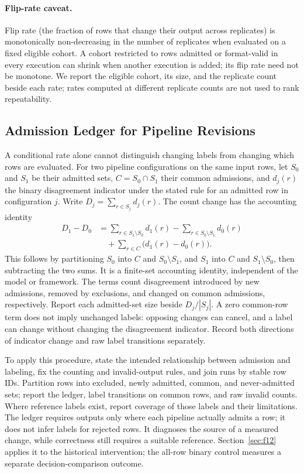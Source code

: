 \documentclass[11pt]{article}
\begin{document}
\paragraph{Flip-rate caveat.}
Flip rate (the fraction of rows that change their output across
replicates) is monotonically non-decreasing in the number of replicates
when evaluated on a fixed eligible cohort. A cohort restricted to rows
admitted or format-valid in every execution can shrink when another execution
is added; its flip rate need not be monotone. We report the eligible cohort,
its size, and the replicate count beside each rate; rates computed at different
replicate counts are not used to rank repeatability.

\subsection{Admission Ledger for Pipeline Revisions}
\label{sec:ledger}

A conditional rate alone cannot distinguish changing labels from changing
which rows are evaluated. For two pipeline configurations on the same input
rows, let $S_0$ and $S_1$ be their admitted sets, $C=S_0\cap S_1$ their common
admissions, and $d_j(r)$ the binary disagreement indicator under the stated
rule for an admitted row in configuration $j$. Write
$D_j=\sum_{r\in S_j}d_j(r)$. The count change has the accounting identity
\begin{equation}
\begin{aligned}
D_1-D_0
 &= \sum_{r\in S_1\setminus S_0}d_1(r)
  - \sum_{r\in S_0\setminus S_1}d_0(r) \\
 &\quad + \sum_{r\in C}\bigl(d_1(r)-d_0(r)\bigr).
\end{aligned}
\label{eq:ledger}
\end{equation}
This follows by partitioning $S_0$ into $C$ and $S_0\setminus S_1$, and
$S_1$ into $C$ and $S_1\setminus S_0$, then subtracting the two sums.
It is a finite-set accounting identity, independent of the model or framework.
The terms count disagreement introduced by new admissions, removed by
exclusions, and changed on common admissions, respectively. Report each
admitted-set size beside $D_j/|S_j|$. A zero common-row term does not imply
unchanged labels: opposing changes can cancel, and a label can change without
changing the disagreement indicator. Record both directions of indicator
change and raw label transitions separately.

To apply this procedure, state the intended relationship between admission
and labeling, fix the counting and invalid-output rules, and join runs by
stable row IDs. Partition rows into excluded, newly admitted, common, and
never-admitted sets; report the ledger, label transitions on common rows,
and raw invalid counts. Where reference labels exist, report coverage of
those labels and their limitations. The ledger requires outputs only where
each pipeline actually admits a row; it does not infer labels for rejected
rows. It diagnoses the source of a measured change, while correctness still
requires a suitable reference. Section~\ref{sec:f12} applies it to the
historical intervention; the all-row binary control measures a separate
decision-comparison outcome.
\end{document}
